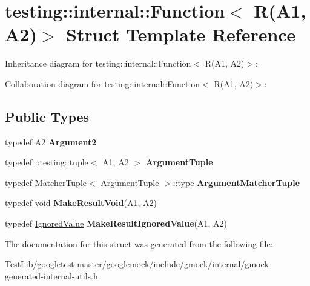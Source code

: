 \hypertarget{structtesting_1_1internal_1_1Function_3_01R_07A1_00_01A2_08_4}{}\section{testing\+:\+:internal\+:\+:Function$<$ R(A1, A2)$>$ Struct Template Reference}
\label{structtesting_1_1internal_1_1Function_3_01R_07A1_00_01A2_08_4}


Inheritance diagram for testing\+:\+:internal\+:\+:Function$<$ R(A1, A2)$>$\+:


Collaboration diagram for testing\+:\+:internal\+:\+:Function$<$ R(A1, A2)$>$\+:
\subsection*{Public Types}
\begin{DoxyCompactItemize}
\item 
\mbox{\label{structtesting_1_1internal_1_1Function_3_01R_07A1_00_01A2_08_4_a025f5192252366d73aa19718bb0ea89d}} 
typedef A2 {\bfseries Argument2}
\item 
\mbox{\label{structtesting_1_1internal_1_1Function_3_01R_07A1_00_01A2_08_4_a2de00437877c29ec6cb78396928b8e3e}} 
typedef \+::testing\+::tuple$<$ A1, A2 $>$ {\bfseries Argument\+Tuple}
\item 
\mbox{\label{structtesting_1_1internal_1_1Function_3_01R_07A1_00_01A2_08_4_ad07042129ff6370f55a279ad12f5e80f}} 
typedef \hyperlink{structtesting_1_1internal_1_1MatcherTuple}{Matcher\+Tuple}$<$ Argument\+Tuple $>$\+::type {\bfseries Argument\+Matcher\+Tuple}
\item 
\mbox{\label{structtesting_1_1internal_1_1Function_3_01R_07A1_00_01A2_08_4_ada1ad22fa21c84ec3faea47ed20c1b46}} 
typedef void {\bfseries Make\+Result\+Void}(A1, A2)
\item 
\mbox{\label{structtesting_1_1internal_1_1Function_3_01R_07A1_00_01A2_08_4_a89033ea870fe831b13899ce36666e102}} 
typedef \hyperlink{classtesting_1_1internal_1_1IgnoredValue}{Ignored\+Value} {\bfseries Make\+Result\+Ignored\+Value}(A1, A2)
\end{DoxyCompactItemize}


The documentation for this struct was generated from the following file\+:\begin{DoxyCompactItemize}
\item 
Test\+Lib/googletest-\/master/googlemock/include/gmock/internal/gmock-\/generated-\/internal-\/utils.\+h\end{DoxyCompactItemize}
